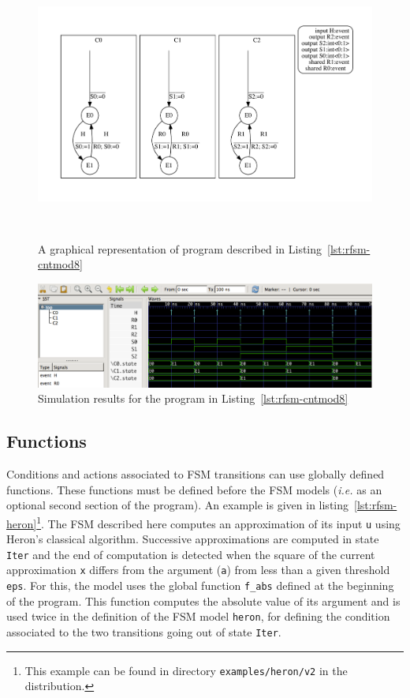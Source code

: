 \begin{figure}[h]
   \includegraphics[height=9cm]{figs/ctrmod8-top}
   \centering
  \caption{A graphical representation of program described in Listing~\ref{lst:rfsm-cntmod8}}
  \label{fig:rfsm-cntmod8-top}
\end{figure}

\begin{figure}[h]
   \includegraphics[width=\textwidth]{figs/ctrmod8-chrono}
   \centering
  \caption{Simulation results for the program in Listing~\ref{lst:rfsm-cntmod8}}
  \label{fig:rfsm-cntmod8-vcd}
\end{figure}

\subsection{Functions}
\label{sec:functions}

Conditions and actions associated to FSM transitions can use globally defined functions. These
functions must be defined before the FSM models (\emph{i.e.} as an optional second section of the
program). An example is given in listing~\ref{lst:rfsm-heron}\footnote{This example can be found in
  directory \texttt{examples/heron/v2} in the distribution.}. The FSM described here computes an
approximation of its input \verb|u| using Heron's classical algorithm. Successive approximations are
computed in state \verb|Iter| and the end of computation is detected when the square of the current
approximation \verb|x| differs from the argument (\verb|a|) from less than a given threshold
\verb|eps|. For this, the model uses the global function \verb|f_abs| defined at the beginning of
the program. This function computes the absolute value of its argument and is used twice in the
definition of the FSM model \verb|heron|, for defining the condition associated to the two
transitions going out of state \verb|Iter|.

